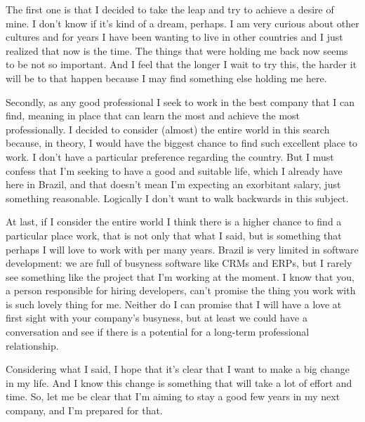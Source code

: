 \documentclass[11pt,a4paper,sans]{moderncv}
\begin{document}
\medskip

The first one is that I decided to take the leap and try to achieve a desire of mine.
I don't know if it's kind of a dream, perhaps.
I am very curious about other cultures and for years I have been wanting to live in other countries and I just realized that now is the time.
The things that were holding me back now seems to be not so important.
And I feel that the longer I wait to try this, the harder it will be to that happen because I may find something else holding me here.

\medskip

Secondly, as any good professional I seek to work in the best company that I can find, meaning in place that can learn the most and achieve the most professionally.
I decided to consider (almost) the entire world in this search because, in theory, I would have the biggest chance to find such excellent place to work.
I don't have a particular preference regarding the country.
But I must confess that I'm seeking to have a good and suitable life, which I already have here in Brazil, and that doesn't mean I'm expecting an exorbitant salary, just something reasonable.
Logically I don't want to walk backwards in this subject.

\medskip

At last, if I consider the entire world I think there is a higher chance to find a particular place work, that is not only that what I said, but is something that perhaps I will love to work with per many years.
Brazil is very limited in software development: we are full of busyness software like CRMs and ERPs, but I rarely see something like the project that I'm working at the moment.
I know that you, a person responsible for hiring developers, can't promise the thing you work with is such lovely thing for me.
Neither do I can promise that I will have a love at first sight with your company's busyness, but at least we could have a conversation and see if there is a potential for a long-term professional relationship.

\medskip

Considering what I said, I hope that it's clear that I want to make a big change in my life.
And I know this change is something that will take a lot of effort and time.
So, let me be clear that I'm aiming to stay a good few years in my next company, and I'm prepared for that.
\end{document}
